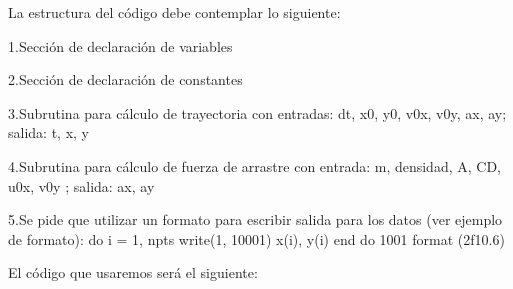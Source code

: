 \documentclass[12pt]{article}
\begin{document}
\vspace{0.5cm}
La estructura del código debe contemplar lo siguiente:
 
1.Sección de declaración de variables

2.Sección de declaración de constantes

3.Subrutina para cálculo de trayectoria con entradas: dt, x0, y0, v0x, v0y, ax, ay; salida: t, x, y 

4.Subrutina para cálculo de fuerza de arrastre con entrada: m, densidad, A, CD, u0x, v0y ; salida: ax, ay

5.Se pide que utilizar un formato para escribir salida para los datos (ver ejemplo de formato):
              do i = 1, npts       
              write(1, 10001) x(i), y(i)
       end do 
  1001 format (2f10.6)
 

\vspace{0.5cm}
El código que usaremos será el siguiente:
\end{document}
